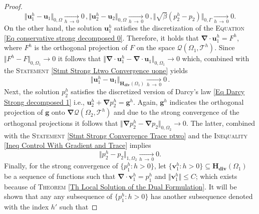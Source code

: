 \documentclass[3p]{elsarticle}
\def\g{\mathbf g}
\def\div{\bm{\nabla} \cdot}
\def\grad{\bm{\nabla}}
\def\uone{\mathbf{u}_{1}}
\def\uoneh{\mathbf{u}_{1}^{h}}
\def\utwo{\mathbf{u}_{2}}
\def\utwoh{\mathbf{u}_{2}^{h}}
\def\Hdiv{\mathbf{H_{div}}}
\def\voneh{\mathbf{v}_{1}^{h}}
\def\poneh{p_{1}^{h}}
\def\ptwo{p_{2}}
\def\ptwoh{p_{2}^{h}}
\def\triang{\mathcal{T}}
\begin{document}
\begin{proof}
\begin{subequations}
\begin{equation}
\Vert \uoneh - \uone \Vert_{0, \Omega} \xrightarrow[h \, \rightarrow \, 0]{}  0 \, ,  
\end{equation}
%
\begin{equation}\label{Stmt Strong Convergence utwo}
\Vert \utwoh - \utwo \Vert_{0, \Omega}  \xrightarrow[h \, \rightarrow \, 0]{}  0 \, , 
\end{equation}
%
\begin{equation}\label{Stmt Strong Convergence Trace ptwo}
\Vert \sqrt{\beta} (\ptwoh - \ptwo) \Vert_{0, \Gamma} 
\xrightarrow[h \, \rightarrow \, 0]{}  0 .
\end{equation}
%
\end{subequations}
%
On the other hand, the solution $\uoneh$ satisfies the discretization of the \textsc{Equation} \eqref{Eq conservative strong decomposed 0}. Therefore, it holds that $\div \uoneh = F^{h}$, where $F^{h}$ is the orthogonal projection of $F$ on the space $\mathcal{Q}(\Omega_{1}, \triang^{h})$. Since $\Vert F^{h} - F\Vert_{0, \Omega_{1}}\rightarrow 0$ it follows that $\Vert \div \uoneh - \div \uone\Vert_{0, \Omega_{1}}\rightarrow 0$ which, combined with the \textsc{Statement} \eqref{Stmt Strong Ltwo Convergence uone} yields
%
\begin{equation}\label{Stmt Strong Hdiv Convergence uone}
\Vert \uoneh - \uone \Vert_{\Hdiv(\Omega_{1})} 
\xrightarrow[h \, \rightarrow \, 0]{} 0 \, . 
\end{equation}
%
Next, the solution $\ptwoh$ satisfies the discretized version of Darcy's law \eqref{Eq Darcy Strong decomposed 1} i.e., $\utwoh + \grad \ptwoh = \g^{h}$. Again, $\g^{h}$ indicates the orthogonal projection of $\g$ onto $\grad \mathcal{Q}(\Omega_{2}, \triang^{h})$ and due to the strong convergence of the orthogonal projections it follows that $\Vert \grad \ptwoh - \grad \ptwo\Vert_{0, \Omega_{2}}\rightarrow 0$. The latter, combined with the \textsc{Statement} \eqref{Stmt Strong Convergence Trace ptwo} and the \textsc{Inequality} \eqref{Ineq Control With Gradient and Trace} implies
%
\begin{equation}\label{Stmt Strong Convergence ptwo}
\Vert \ptwoh - \ptwo \Vert_{1, \Omega_{2}} 
\xrightarrow[h \, \rightarrow \, 0]{} 0 .
\end{equation}
%
Finally, for the strong convergence of $ \big\{ \poneh: h > 0\big\} $, let $ \big\{ \voneh: h > 0\big\} \subseteq \Hdiv(\Omega_{1}) $ be a sequence of functions such that $ \div \voneh = \poneh $ and $ \Vert \voneh \Vert \leq C $; which exists because of \textsc{Theorem} \ref{Th Local Solution of the Dual Formulation}. It will be shown that any any subsequence of $ \big\{ \poneh: h > 0\big\} $ has another subsequence denoted with the index $ h' $ such that 

\end{proof}
\end{document}
